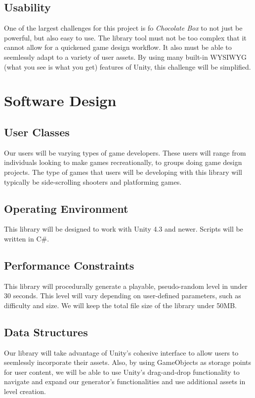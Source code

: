 \documentclass[pdftex,12pt,letter]{article}
\begin{document}
\begin{itemize}
\begin{itemize}
\begin{itemize}
\subsection{Usability}
One of the largest challenges for this project is fo \textit{Chocolate Box} to not just be powerful, but also easy to use. The library tool must not be too complex that it cannot allow for a quickened game design workflow. It also must be able to seemlessly adapt to a variety of user assets. By using many built-in WYSIWYG (what you see is what you get) features of Unity, this challenge will be simplified. 


\section{Software Design}
\subsection{User Classes}
Our users will be varying types of game developers. These users will range from individuals looking to make games recreationally, to groups doing game design projects. The type of games that users will be developing with this library will typically be side-scrolling shooters and platforming games.
\subsection{Operating Environment}
This library will be designed to work with Unity 4.3 and newer. Scripts will be written in C\#.
\subsection{Performance Constraints}
This library will procedurally generate a playable, pseudo-random level in under 30 seconds. This level will vary depending on user-defined parameters, such as difficulty and size. We will keep the total file size of the library under 50MB.
\subsection{Data Structures}
Our library will take advantage of Unity's cohesive interface to allow users to seemlessly incorporate their assets.  Also, by using GameObjects as storage points for user content, we will be able to use Unity's drag-and-drop functionality to navigate and expand our generator's functionalities and use additional assets in level creation.


\end{itemize}
\end{itemize}
\end{itemize}
\end{document}
